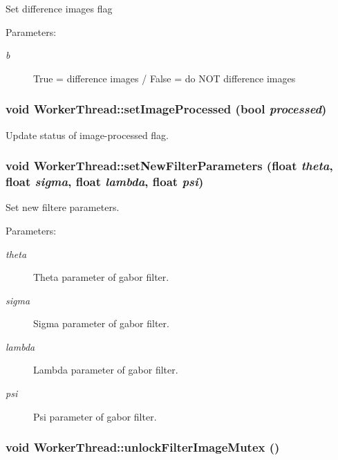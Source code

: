 Set difference images flag \begin{Desc}
\item[Parameters:]
\begin{description}
\item[{\em b}]True = difference images / False = do NOT difference images \end{description}
\end{Desc}
\hypertarget{classWorkerThread_cca9ec5f0263638f8bafb5fc9cd46a07}{
\subsubsection[{setImageProcessed}]{\setlength{\rightskip}{0pt plus 5cm}void WorkerThread::setImageProcessed (bool {\em processed})}}
\label{classWorkerThread_cca9ec5f0263638f8bafb5fc9cd46a07}


Update status of image-processed flag. \hypertarget{classWorkerThread_e8e56694aa4f03dfef4c206269f7ef8d}{
\subsubsection[{setNewFilterParameters}]{\setlength{\rightskip}{0pt plus 5cm}void WorkerThread::setNewFilterParameters (float {\em theta}, \/  float {\em sigma}, \/  float {\em lambda}, \/  float {\em psi})}}
\label{classWorkerThread_e8e56694aa4f03dfef4c206269f7ef8d}


Set new filtere parameters. \begin{Desc}
\item[Parameters:]
\begin{description}
\item[{\em theta}]Theta parameter of gabor filter. \item[{\em sigma}]Sigma parameter of gabor filter. \item[{\em lambda}]Lambda parameter of gabor filter. \item[{\em psi}]Psi parameter of gabor filter. \end{description}
\end{Desc}
\hypertarget{classWorkerThread_dfb13dc544bc59abc5b703c27d9767ef}{
\subsubsection[{unlockFilterImageMutex}]{\setlength{\rightskip}{0pt plus 5cm}void WorkerThread::unlockFilterImageMutex ()}}
\label{classWorkerThread_dfb13dc544bc59abc5b703c27d9767ef}


